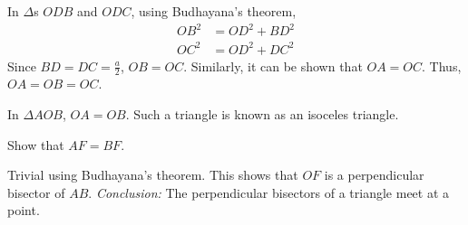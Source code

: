 \proof In $\Delta$s $ODB$ and $ODC$, using Budhayana's theorem,
%
\begin{equation}
\begin{split}
OB^2 &= OD^2 + BD^2 \\
OC^2 &= OD^2 + DC^2 
\end{split}
\end{equation}
%
Since $BD = DC = \frac{a}{2}$, $OB = OC$.  Similarly, it can be shown that $OA = OC$.  Thus, $OA=OB=OC$.
%
\begin{definition}
	In $\Delta AOB$, $OA = OB$.  Such a triangle is known as an isoceles triangle.
\end{definition}
%
\begin{problem}
	Show that $AF = BF$.
\end{problem}
\proof Trivial using Budhayana's theorem.  This shows that $OF$ is a perpendicular bisector of $AB$. 
{\em Conclusion:}  The perpendicular bisectors of a triangle meet at a point.
%
